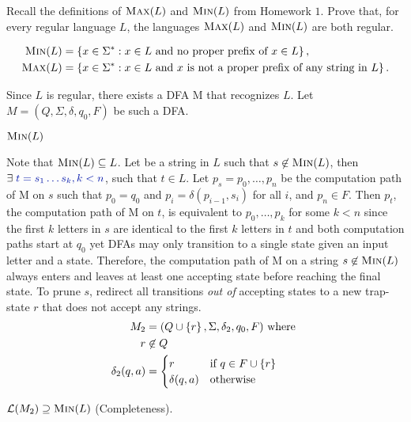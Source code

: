 \begin{problem}
  Recall the definitions of $\textsc{Max}(L)$ and $\textsc{Min}(L)$ from Homework $1$.
  Prove that, for every regular language $L$, the languages
  $\textsc{Max}(L)$ and $\textsc{Min}(L)$ are both regular.

  \step
  \begin{align*}
    \textsc{Min}(L) &= \set{x \in \Sigma^* : x \in L \text{ and no proper prefix of } x \in L},\\
    \textsc{Max}(L) &= \set{x \in \Sigma^* : x \in L \text{ and $x$ is not a proper prefix of any string in $L$}}.
  \end{align*}
  \begin{Answer}
    Since $L$ is regular, there exists a DFA M that recognizes $L$.
    Let $M = (Q, \Sigma, \delta, q_0, F)$ be such a DFA.
    \begin{enumalph}
      \item $\textsc{Min}(L)$
        
        \step
        Note that $\textsc{Min}(L) \subseteq L$.
        Let  be a string in $L$
        such that $s \notin \textsc{Min}(L)$,
        then $\exists\; \zaff{t = s_1 \ldots s_k, k < n}$, such that $t \in L$.
        Let $p_s = p_0,\ldots, p_n$ be the computation path of M on $s$
        such that $p_0 = q_0$ and $p_i = \delta(p_{i-1}, s_i)$ for all $i$, and $p_n \in F$.
        Then $p_t$, the computation path of M on $t$,
        is equivalent to $p_0, \ldots, p_k$ for some $k < n$
        since the first $k$ letters in $s$ are identical to the first $k$ letters in $t$
        and both computation paths start at $q_0$ yet DFAs may only transition
        to a single state given an input letter and a state.
        Therefore, the computation path of M on a string $s \notin \textsc{Min}(L)$
        always enters and leaves
        at least one accepting state before reaching the final state.
        To prune $s$, redirect all transitions \emph{out of} accepting states
        to a new trap-state $r$ that does not accept any strings.
        \begin{align*}
          M_2 &= (Q \cup \set{r}, \Sigma, \delta_2, q_0, F) \text{ where }\\
          r &\notin Q \\
          \delta_2(q, a) &= \begin{cases}
            r & \text{if $q \in F \cup \set{r}$ } \\
            \delta(q, a) & \text{otherwise } \\
          \end{cases}
        \end{align*}
        \begin{enumroman}
          \item $\calL(M_2) \supseteq \textsc{Min}(L)$ (Completeness).
            

\end{enumroman}
\end{enumalph}
\end{Answer}
\end{problem}
